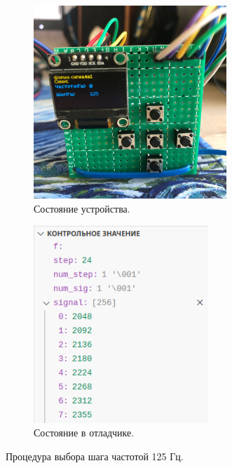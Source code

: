 	\begin{figure}[H]\captionsetup[subfigure]{font=normalsize}
     \begin{subfigure}[H]{0.5\textwidth}
         \centering
         \includegraphics[width=0.8\textwidth]{../image/test1_u_st.jpg}
         \caption{Состояние устройства.}
     \end{subfigure}
     \hfill
     \begin{subfigure}[H]{0.5\textwidth}
         \centering
         \includegraphics[width=0.725\textwidth]{../image/test1_o_st.png}
         \caption{Состояние в отладчике.}
     \end{subfigure}
        \caption{Процедура выбора шага частотой 125 Гц.}
	\end{figure}
	
